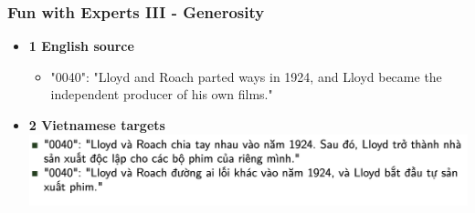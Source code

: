 \documentclass[aspectratio=169]{beamer}
\begin{document}
\begin{frame}[fragile]
	\frametitle{Fun with Experts III - Generosity}
    \centering
    \begin{itemize}
        \item \textbf{1 English source}
        \begin{itemize}
            \item "0040": "Lloyd and Roach parted ways in 1924, and Lloyd became the independent producer of his own films."
        \end{itemize}
        \item \textbf{2 Vietnamese targets}
        \includegraphics[width=\textwidth]{images/challenge-vie-2.png}
    \end{itemize}
\end{frame}
\end{document}
